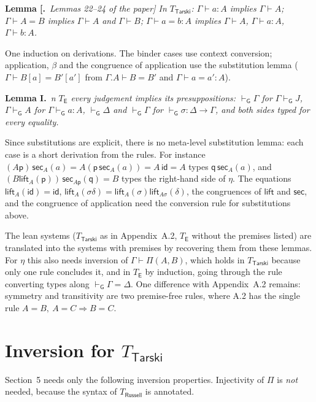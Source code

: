 \documentclass[11pt]{article}
\newenvironment{lemma}[1]{\par\medskip\noindent\textbf{Lemma #1.}\ \itshape}{\par\medskip}
\theoremstyle{definition}
\theoremstyle{remark}
\newcommand{\vdashG}{\vdash_{\mathsf G}}
\newcommand{\p}{\mathsf p}
\newcommand{\q}{\mathsf q}
\newcommand{\id}{\mathsf{id}}
\newcommand{\lift}{\mathsf{lift}}
\newcommand{\sect}{\mathsf{sec}}
\begin{document}
\begin{lemma}[Lemmas 22--24 of the paper]
In $T_{\mathsf{Tarski}}$: $\Gamma\vdash a:A$ implies $\Gamma\vdash A$;
$\Gamma\vdash A=B$ implies $\Gamma\vdash A$ and $\Gamma\vdash B$;
$\Gamma\vdash a=b:A$ implies $\Gamma\vdash A$, $\Gamma\vdash a:A$, $\Gamma\vdash b:A$.
\end{lemma}
One induction on derivations. The binder cases use context conversion; application,
$\beta$ and the congruence of application use the substitution lemma
($\Gamma\vdash B[a]=B'[a']$ from $\Gamma.A\vdash B=B'$ and $\Gamma\vdash a=a':A$).

\begin{lemma}
In $T_{\mathsf E}$ every judgement implies its presuppositions: $\vdashG\Gamma$ for
$\Gamma\vdashG J$, $\Gamma\vdashG A$ for $\Gamma\vdashG a:A$, $\vdashG\Delta$ and $\vdashG\Gamma$
for $\vdashG\sigma:\Delta\to\Gamma$, and both sides typed for every equality.
\end{lemma}
Since substitutions are explicit, there is no meta-level substitution lemma:
each case is a short derivation from the rules. For instance
$(A\p)\,\sect_A(a)=A(\p\,\sect_A(a))=A\,\id=A$ types $\q\,\sect_A(a)$, and
$(B\lift_A(\p))\,\sect_{A\p}(\q)=B$ types the right-hand side of $\eta$.
The equations $\lift_A(\id)=\id$, $\lift_A(\sigma\delta)=\lift_A(\sigma)\lift_{A\sigma}(\delta)$,
the congruences of $\lift$ and $\sect$, and the congruence of application need
the conversion rule for substitutions above.

The lean systems ($T_{\mathsf{Tarski}}$ as in Appendix~A.2, $T_{\mathsf E}$ without the
premises listed) are translated into the systems with premises by recovering
them from these lemmas. For $\eta$ this also needs inversion of
$\Gamma\vdash\Pi(A,B)$, which holds in $T_{\mathsf{Tarski}}$ because only one rule
concludes it, and in $T_{\mathsf E}$ by induction, going through the rule converting
types along $\vdashG\Gamma=\Delta$. One difference with Appendix~A.2 remains: symmetry and
transitivity are two premise-free rules, where A.2 has the single rule
$A=B,\ A=C\Rightarrow B=C$.

\section{Inversion for $T_{\mathsf{Tarski}}$}\label{sec:inv}

Section~5 needs only the following inversion properties. Injectivity of
$\Pi$ is \emph{not} needed, because the syntax of $T_{\mathsf{Russell}}$
is annotated.
\end{document}
